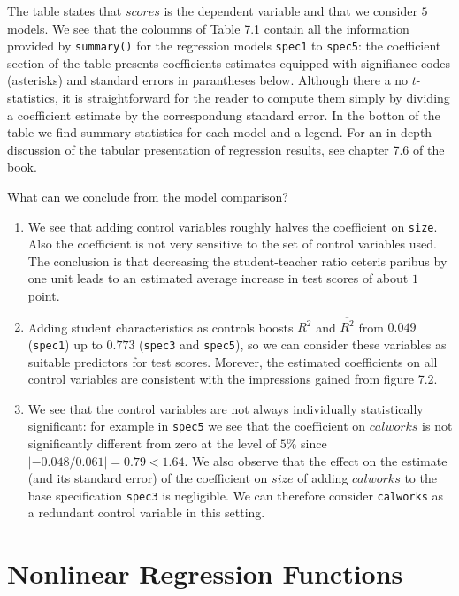 \documentclass[]{book}
\theoremstyle{definition}
\theoremstyle{definition}
\theoremstyle{definition}
\theoremstyle{remark}
\begin{document}
The table states that \(scores\) is the dependent variable and that we
consider \(5\) models. We see that the coloumns of Table 7.1 contain all
the information provided by \texttt{summary()} for the regression models
\texttt{spec1} to \texttt{spec5}: the coefficient section of the table
presents coefficients estimates equipped with signifiance codes
(asterisks) and standard errors in parantheses below. Although there a
no \(t\)-statistics, it is straightforward for the reader to compute
them simply by dividing a coefficient estimate by the correspondung
standard error. In the botton of the table we find summary statistics
for each model and a legend. For an in-depth discussion of the tabular
presentation of regression results, see chapter 7.6 of the book.

What can we conclude from the model comparison?

\begin{enumerate}
\def\labelenumi{\arabic{enumi}.}
\item
  We see that adding control variables roughly halves the coefficient on
  \texttt{size}. Also the coefficient is not very sensitive to the set
  of control variables used. The conclusion is that decreasing the
  student-teacher ratio ceteris paribus by one unit leads to an
  estimated average increase in test scores of about \(1\) point.
\item
  Adding student characteristics as controls boosts \(R^2\) and
  \(\overline{R^2}\) from \(0.049\) (\texttt{spec1}) up to \(0.773\)
  (\texttt{spec3} and \texttt{spec5}), so we can consider these
  variables as suitable predictors for test scores. Morever, the
  estimated coefficients on all control variables are consistent with
  the impressions gained from figure 7.2.
\item
  We see that the control variables are not always individually
  statistically significant: for example in \texttt{spec5} we see that
  the coefficient on \(calworks\) is not significantly different from
  zero at the level of \(5\%\) since
  \(\lvert-0.048/0.061\rvert=0.79 < 1.64\). We also observe that the
  effect on the estimate (and its standard error) of the coefficient on
  \(size\) of adding \(calworks\) to the base specification
  \texttt{spec3} is negligible. We can therefore consider
  \texttt{calworks} as a redundant control variable in this setting.
\end{enumerate}

\chapter{Nonlinear Regression
Functions}\label{nonlinear-regression-functions}
\end{document}
